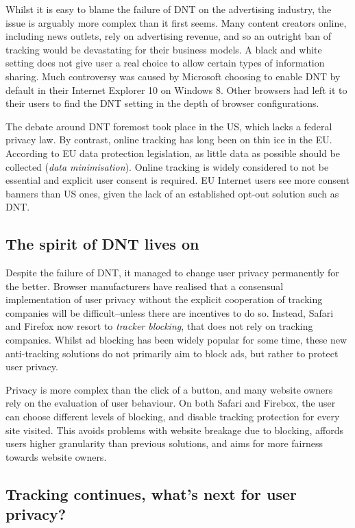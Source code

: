 \documentclass[
]{book}
\begin{document}
Whilst it is easy to blame the failure of DNT on the advertising industry, the issue is arguably more complex than it first seems. Many content creators online, including news outlets, rely on advertising revenue, and so an outright ban of tracking would be devastating for their business models. A black and white setting does not give user a real choice to allow certain types of information sharing. Much controversy was caused by Microsoft choosing to enable DNT by default in their Internet Explorer 10 on Windows 8. Other browsers had left it to their users to find the DNT setting in the depth of browser configurations.

The debate around DNT foremost took place in the US, which lacks a federal privacy law. By contrast, online tracking has long been on thin ice in the EU. According to EU data protection legislation, as little data as possible should be collected (\emph{data minimisation}). Online tracking is widely considered to not be essential and explicit user consent is required. EU Internet users see more consent banners than US ones, given the lack of an established opt-out solution such as DNT.

\hypertarget{the-spirit-of-dnt-lives-on}{%
\subsection{The spirit of DNT lives on}\label{the-spirit-of-dnt-lives-on}}

Despite the failure of DNT, it managed to change user privacy permanently for the better. Browser manufacturers have realised that a consensual implementation of user privacy without the explicit cooperation of tracking companies will be difficult--unless there are incentives to do so. Instead, Safari and Firefox now resort to \emph{tracker blocking}, that does not rely on tracking companies. Whilst ad blocking has been widely popular for some time, these new anti-tracking solutions do not primarily aim to block ads, but rather to protect user privacy.

Privacy is more complex than the click of a button, and many website owners rely on the evaluation of user behaviour. On both Safari and Firebox, the user can choose different levels of blocking, and disable tracking protection for every site visited. This avoids problems with website breakage due to blocking, affords users higher granularity than previous solutions, and aims for more fairness towards website owners.

\hypertarget{tracking-continues-whats-next-for-user-privacy}{%
\subsection{Tracking continues, what's next for user privacy?}\label{tracking-continues-whats-next-for-user-privacy}}
\end{document}
